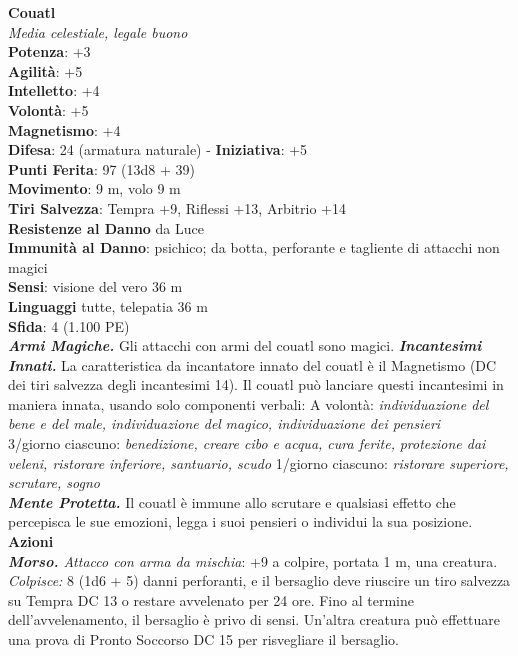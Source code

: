 \begin{multicols}{2}
\medskip\textbf{Couatl}\\
\emph{Media celestiale, legale buono}\\
\textbf{Potenza}: +3\\
\textbf{Agilità}: +5\\
\textbf{Intelletto}: +4\\
\textbf{Volontà}: +5\\
\textbf{Magnetismo}: +4\\
\textbf{Difesa}: 24 (armatura naturale) - \textbf{Iniziativa}: +5\\
\textbf{Punti Ferita}: 97 (13d8 + 39)\\
\textbf{Movimento}: 9 m, volo 9 m\\
\textbf{Tiri Salvezza}: Tempra +9, Riflessi +13, Arbitrio +14\\
\textbf{Resistenze al Danno} da Luce\\
\textbf{Immunità al Danno}: psichico; da botta, perforante e tagliente di attacchi non magici\\
\textbf{Sensi}: visione del vero 36 m\\
\textbf{Linguaggi} tutte, telepatia 36 m \\
\textbf{Sfida}: 4 (1.100 PE)\smallskip\\
\emph{\textbf{Armi Magiche.}} Gli attacchi con armi del couatl sono magici.
\emph{\textbf{Incantesimi Innati.}} La caratteristica da incantatore innato del couatl è il Magnetismo (DC dei tiri salvezza degli incantesimi 14). Il couatl può lanciare questi incantesimi in maniera innata, usando solo componenti verbali:
A volontà: \emph{individuazione del bene e del male, individuazione del} \emph{magico, individuazione dei pensieri}\\
3/giorno ciascuno: \emph{benedizione, creare cibo e acqua, cura ferite,} \emph{protezione dai veleni, ristorare inferiore, santuario, scudo} 1/giorno ciascuno: \emph{ristorare superiore, scrutare, sogno}\\
\emph{\textbf{Mente Protetta.}} Il couatl è immune allo scrutare e qualsiasi effetto che percepisca le sue emozioni, legga i suoi pensieri o individui la sua posizione.\\
\smallskip\textbf{Azioni}\\
\emph{\textbf{Morso.} Attacco con arma da mischia}: +9 a colpire, portata 1 m, una creatura.\\
\emph{Colpisce:} 8 (1d6 + 5) danni perforanti, e il bersaglio deve riuscire un tiro salvezza su Tempra DC 13 o restare avvelenato per 24 ore. Fino al termine dell'avvelenamento, il bersaglio è privo di sensi. Un'altra creatura può effettuare una prova di Pronto Soccorso DC 15 per risvegliare il bersaglio.\\

\end{multicols}
